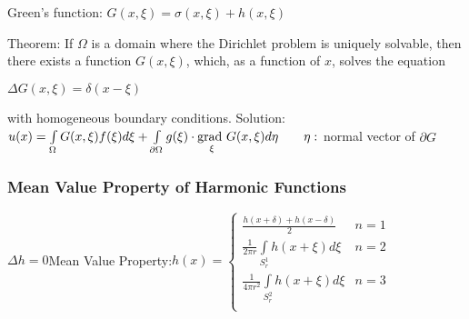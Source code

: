Green's function: $G(x,\xi)=\sigma(x,\xi)+h(x,\xi)$

Theorem: If $\Omega$ is a domain where the Dirichlet problem is uniquely solvable, then there exists a function $G(x,\xi)$, which, as a function of $x$, solves the equation

$\Delta G(x,\xi)=\delta(x-\xi)$

with homogeneous boundary conditions.
Solution: $u(x)=\int\limits_{\Omega}^{}{G(x,\xi)f(\xi)d\xi}+\int\limits_{\partial\Omega}g(\xi)\cdot\underset{\xi}{\mathrm{grad~}}G(x,\xi)d\eta\qquad \eta:$ normal vector of $\partial G$

\subsubsection{Mean Value Property of Harmonic Functions}

$\Delta h=0$\qquad Mean Value Property:\qquad $h(x)=
\begin{cases}
	\frac{h(x+\delta)+h(x-\delta)}{2}& n=1 \\
	\frac 1{2\pi r} \int\limits_{S_r^1}{h(x+\xi)d\xi} & n=2\\
	\frac 1{4\pi r^2} \int\limits_{S_r^2}{h(x+\xi)d\xi} & n=3\\
\end{cases}$
